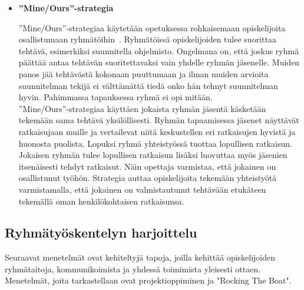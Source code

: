 \documentclass[finnish]{../tktltiki2}
\theoremstyle{definition}
\theoremstyle{remark}
\begin{document}
\begin{itemize}
\item {\bf ''Mine/Ours''-strategia}

''Mine/Ours''-strategiaa käytetään opetuksessa rohkaisemaan
opiskelijoita osallistumaan ryhmätöihin~\cite{1158709}. Ryhmätöissä opiskelijoiden tulee suorittaa tehtävä, esimerkiksi suunnitella ohjelmisto. Ongelmana on, että joskus ryhmä päättää antaa tehtävän suoritettavaksi vain yhdelle ryhmän jäsenelle. Muiden panos jää tehtävästä kokonaan puuttumaan ja ilman muiden arvioita suunnitelman tekijä ei välttämättä tiedä onko hän tehnyt suunnitelman hyvin. Pahimmassa tapauksessa ryhmä ei opi mitään.\\

''Mine/Ours''-strategiaa käyttäen jokaista ryhmän jäsentä käsketään tekemään sama tehtävä yksilöllisesti. Ryhmän tapaamisessa jäsenet näyttävät ratkaisujaan muille ja vertailevat niitä keskustellen eri ratkaisujen hyvistä ja huonosta puolista. Lopuksi ryhmä yhteistyössä tuottaa lopullisen ratkaisun. Jokaisen ryhmän tulee lopullisen ratkaisun lisäksi luovuttaa myös jäsenien itsenäisesti tehdyt ratkaisut. Näin opettaja varmistaa, että jokainen on osallistunut työhön. Strategia auttaa opiskelijoita tekemään yhteistyötä varmistamalla, että jokainen on valmistautunut tehtävään etukäteen tekemällä oman henkilökohtaisen ratkaisunsa. 

\end{itemize}

\subsection{Ryhmätyöskentelyn harjoittelu}

Seuraavat menetelmät ovat kehiteltyjä tapoja, joilla kehittää
opiskelijoiden ryhmätaitoja, kommunikoimista ja yhdessä toimimista
yleisesti ottaen. Menetelmät, joita tarkastellaan ovat 
projektioppiminen ja "Rocking The Boat".
\end{document}
